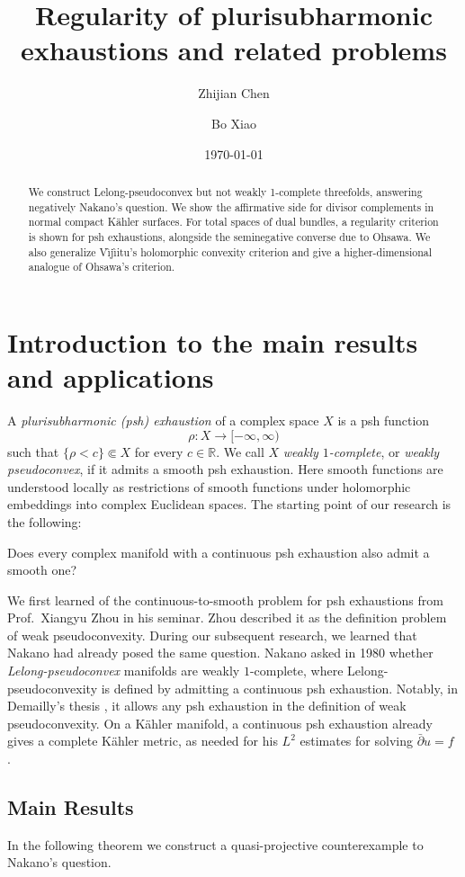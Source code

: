 \documentclass[11pt]{amsart}
\title[Regularity of plurisubharmonic exhaustions]{Regularity of
plurisubharmonic exhaustions and related problems}
\author{Zhijian Chen}
\author{Bo Xiao}
\date{\today}
\theoremstyle{definition}
\theoremstyle{remark}
\numberwithin{equation}{section}
\newcommand{\R}{\mathbb R}
\newcommand{\barp}{\bar\partial}
\begin{document}
\begin{abstract}
We construct Lelong-pseudoconvex but not weakly 1-complete threefolds,
answering negatively Nakano's question. We show the affirmative side for divisor complements in normal
compact K\"ahler surfaces. For total spaces of dual bundles, a regularity criterion is shown for psh exhaustions, alongside the seminegative converse due to Ohsawa.
We also generalize V\^{\i}j\^{\i}itu's holomorphic convexity criterion and
give a higher-dimensional analogue of Ohsawa's criterion.
\end{abstract}
\maketitle
\tableofcontents

\section{Introduction to the main results and applications}\label{sec:intro}

A \emph{plurisubharmonic (psh) exhaustion} of a  complex
space $X$ is a psh function
\[
\rho:X\to[-\infty,\infty)
\]
such that
$\{\rho<c\}\Subset X$ for every $c\in\R$.
We call $X$ \emph{weakly $1$-complete}, or \emph{weakly
pseudoconvex}, if it admits a smooth psh exhaustion. Here smooth functions are understood locally
as restrictions of smooth functions under holomorphic embeddings into
complex Euclidean spaces. The starting point of our research is the following:

Does every complex manifold with a continuous psh exhaustion also admit a smooth one?

We first learned of the continuous-to-smooth problem for psh exhaustions from Prof.~Xiangyu Zhou in his seminar. Zhou described it as the definition problem of weak pseudoconvexity.
During our subsequent research, we learned that Nakano had already posed the same question.
Nakano asked in 1980 \cite[\S I.1, Problem~1]{Wakabayashi1980} whether \emph{Lelong-pseudoconvex} manifolds are weakly $1$-complete, where Lelong-pseudoconvexity is defined by admitting a continuous
psh exhaustion.
Notably, in Demailly's thesis \cite{Demailly1982}, it allows any psh exhaustion in the definition of weak pseudoconvexity.
On a K\"ahler manifold, a continuous psh exhaustion already gives a complete K\"ahler metric, as needed for his $L^2$ estimates for solving $\barp u=f$ \cite[Theorems~1.3 and~4.1]{DemaillyL2}.

\subsection{Main Results}
In the following theorem we construct a quasi-projective counterexample to Nakano's question.
\end{document}
